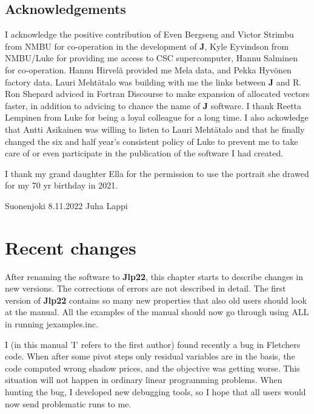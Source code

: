 \subsection*{Acknowledgements}



I acknowledge the positive contribution of
Even Bergseng and Victor Strimbu from NMBU for co-operation in the development of \textbf{J}, Kyle Eyvindson from NMBU/Luke for
providing me access to CSC supercomputer, Hannu Salminen for co-operation.
Hannu Hirvel\"a  provided me Mela data, and Pekka Hyv\"onen factory data.
Lauri Meht\"atalo was building with me the links between \textbf{J} and R.
Ron Shepard adviced in Fortran Discourse to make expansion of allocated
vectors faster, in addition to advicing to chance the name of \textbf{J} software.
I thank Reetta Lempinen from Luke for being a loyal colleague for a long time.
I also ackowledge that Antti Asikainen was willing to listen to Lauri Meht\"atalo
and that he finally changed the six and half year's consistent policy of Luke
to prevent me to take
care of or even participate in the publication of the software I had created.

I thank my grand daughter Ella
for the permission to use the portrait she drawed for my 70 yr birthday in 2021.

\vspace{0.5cm}
Suonenjoki 8.11.2022
\vspace{0.5cm}
Juha Lappi


\section{Recent changes}
\label{changes}

After renaming the software to \textbf{Jlp22}, this chapter starts to describe changes in new versions.
The corrections of errors are not described in detail. The first version of \textbf{Jlp22} contains so many new properties that also old users
should look at the manual. All the examples of the manual should now go through using ALL in running
jexamples.inc.

I (in this manual 'I' refers to the first author) found recently a bug in Fletchers code. When after some pivot steps only residual variables
are in the basis, the code computed wrong shadow prices, and the objective was getting worse.
This situation will not happen in ordinary linear programming problems. When hunting the bug, I developed new
debugging tools, so I hope that all users would now send problematic
runs to me.
